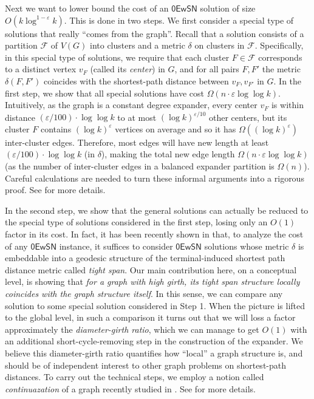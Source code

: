 \documentclass[11pt]{article}
\theoremstyle{definition}
\newcommand{\fset}{{\mathcal{F}}}
\newcommand{\eps}{{\varepsilon}}
\newcommand{\zesn}{\mathsf{0EwSN}}
\begin{document}
\begin{titlepage}
Next we want to lower bound the cost of an $\zesn$ solution of size $O(k\log^{1-\eps} k)$. This is done in two steps. We first consider a special type of solutions that really ``comes from the graph''. Recall that a solution consists of a partition $\fset$ of $V(G)$ into clusters and a metric $\delta$ on clusters in $\fset$. Specifically, in this special type of solutions, we require that each cluster $F\in \fset$ corresponds to a distinct vertex $v_F$ (called its \emph{center}) in $G$, and for all pairs $F,F'$ the metric $\delta(F,F')$ coincides with the shortest-path distance between $v_F, v_{F'}$ in $G$.
In the first step, we show that all special solutions have cost $\Omega(n\cdot \eps \log\log k)$. Intuitively, as the graph is a constant degree expander, every center $v_F$ is within distance $(\eps/100)\cdot \log\log k$ to at most $(\log k)^{\eps/10}$ other centers, but its cluster $F$ contains $(\log k)^{\eps}$ vertices on average and so it has $\Omega((\log k)^{\eps})$ inter-cluster edges. Therefore, most edges will have new length at least $(\eps/100)\cdot \log\log k$ (in $\delta$), making the total new edge length $\Omega(n \cdot \eps \log\log k)$ (as the number of inter-cluster edges in a balanced expander partition is $\Omega(n)$). Careful calculations are needed to turn these informal arguments into a rigorous proof. See  for more details.

In the second step, we show that the general solutions can actually be reduced to the special type of solutions considered in the first step, losing only an $O(1)$ factor in its cost. In fact, it has been recently shown in \cite{chen20241+} that, to analyze the cost of any $\zesn$ instance, it suffices to consider $\zesn$ solutions whose metric $\delta$ is embeddable into a geodesic structure of the terminal-induced shortest path distance metric called \emph{tight span}. Our main contribution here, on a conceptual level, is showing that \emph{for a graph with high girth, its tight span structure locally coincides with the graph structure itself}. In this sense, we can compare any solution to some special solution considered in Step 1. When the picture is lifted to the global level, in such a comparison it turns out that we will loss a factor approximately the \emph{diameter-girth ratio}, which we can manage to get $O(1)$ with an additional short-cycle-removing step in the construction of the expander. We believe this diameter-girth ratio quantifies how ``local'' a graph structure is, and should be of independent interest to other graph problems on shortest-path distances.
To carry out the technical steps, we employ a notion called \emph{continuazation} of a graph recently studied in \cite{chen2023towards}.
See  for more details.



\end{titlepage}
\end{document}
